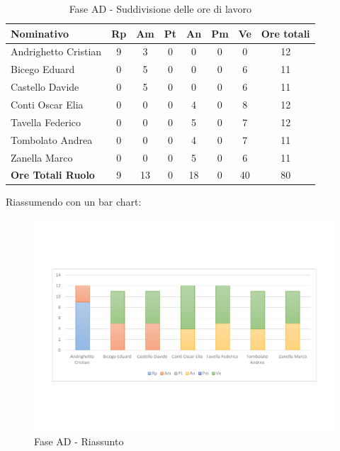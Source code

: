 \documentclass[../PianoProgetto.tex]{subfiles}
\begin{document}
	\begin{table}[h]
		\begin{tabularx}{\textwidth}{l  * {6}{C}  c}
			\toprule
			\textbf{Nominativo} & \textbf{Rp} & \textbf{Am} & \textbf{Pt} 
						& \textbf{An} & \textbf{Pm} & \textbf{Ve} & \textbf{Ore totali} \\
			\midrule
			Andrighetto Cristian & 9 & 3 &	0 &	0 & 0 & 0 & 12 \\
			Bicego Eduard & 0 & 5 & 0 & 0 & 0 & 6 & 11 \\
			Castello Davide & 0 & 5 & 0 & 0 & 0 & 6 & 11 \\
			Conti Oscar Elia & 0 & 0 &	0 &	4 & 0 & 8 & 12 \\
			Tavella Federico &	0 & 0 & 0 & 5 & 0 & 7 & 12 \\
			Tombolato Andrea & 0 & 0 &	0 &	4 & 0 & 7 & 11 \\
			Zanella Marco & 0 & 0 & 0 & 5 & 0 & 6 & 11 \\
			\midrule			
			\textbf{Ore Totali Ruolo} & 9 & 13 & 0 & 18 & 0 & 40 & 80 \\
			\bottomrule
		\end{tabularx}	
		\caption{Fase AD - Suddivisione delle ore di lavoro}
		\label{tab:faseAD_ore}	
	\end{table}
\vfill
\newpage
\vfill
	Riassumendo con un bar chart:
	
	\begin{figure}[!h]
		\centering
		\includegraphics[width=\textwidth , trim=2cm 5cm 2cm 5cm]{grafici/AD/AD-ore-persona}
			\caption{Fase AD - Riassunto}
		\label{fig:BarChart-faseAD_ore}
	\end{figure}
	
\end{document}
